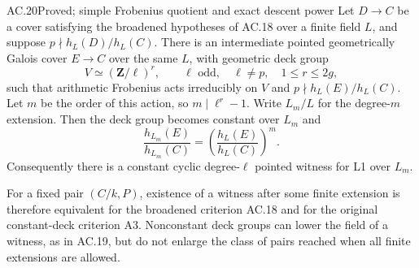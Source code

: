 \begin{claim}{AC.20}{Proved; simple Frobenius quotient and exact descent power}
Let $D\to C$ be a cover satisfying the broadened hypotheses of AC.18
over a finite field $L$, and suppose $p\nmid h_L(D)/h_L(C)$.
There is an intermediate pointed geometrically Galois cover $E\to C$
over the same $L$, with geometric deck group
\[
                    V\simeq(\mathbf Z/\ell)^r,
             \qquad \ell\text{ odd},\quad \ell\ne p,
             \quad 1\le r\le2g,
\]
such that arithmetic Frobenius acts irreducibly on $V$ and
$p\nmid h_L(E)/h_L(C)$.  Let $m$ be the order of this action, so
$m\mid\ell^r-1$.  Write $L_m/L$ for the degree-$m$ extension.  Then
the deck group becomes constant over $L_m$ and
\[
             \frac{h_{L_m}(E)}{h_{L_m}(C)}
                  =\left(\frac{h_L(E)}{h_L(C)}\right)^m. \tag{AC.12}
\]
Consequently there is a constant cyclic degree-$\ell$ pointed witness
for L1 over $L_m$.

For a fixed pair $(C/k,P)$, existence of a witness after some finite
extension is therefore equivalent for the broadened criterion AC.18
and for the original constant-deck criterion A3.  Nonconstant deck
groups can lower the field of a witness, as in AC.19, but do not enlarge
the class of pairs reached when all finite extensions are allowed.
\end{claim}
